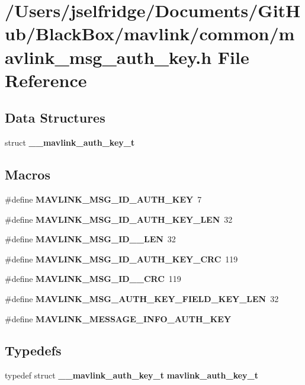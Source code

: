 \section{/\+Users/jselfridge/\+Documents/\+Git\+Hub/\+Black\+Box/mavlink/common/mavlink\+\_\+msg\+\_\+auth\+\_\+key.h File Reference}
\label{mavlink__msg__auth__key_8h}
\subsection*{Data Structures}
\begin{DoxyCompactItemize}
\item 
struct \textbf{ \+\_\+\+\_\+mavlink\+\_\+auth\+\_\+key\+\_\+t}
\end{DoxyCompactItemize}
\subsection*{Macros}
\begin{DoxyCompactItemize}
\item 
\#define \textbf{ M\+A\+V\+L\+I\+N\+K\+\_\+\+M\+S\+G\+\_\+\+I\+D\+\_\+\+A\+U\+T\+H\+\_\+\+K\+EY}~7
\item 
\#define \textbf{ M\+A\+V\+L\+I\+N\+K\+\_\+\+M\+S\+G\+\_\+\+I\+D\+\_\+\+A\+U\+T\+H\+\_\+\+K\+E\+Y\+\_\+\+L\+EN}~32
\item 
\#define \textbf{ M\+A\+V\+L\+I\+N\+K\+\_\+\+M\+S\+G\+\_\+\+I\+D\+\_\+\_\+\+L\+EN}~32
\item 
\#define \textbf{ M\+A\+V\+L\+I\+N\+K\+\_\+\+M\+S\+G\+\_\+\+I\+D\+\_\+\+A\+U\+T\+H\+\_\+\+K\+E\+Y\+\_\+\+C\+RC}~119
\item 
\#define \textbf{ M\+A\+V\+L\+I\+N\+K\+\_\+\+M\+S\+G\+\_\+\+I\+D\+\_\+\_\+\+C\+RC}~119
\item 
\#define \textbf{ M\+A\+V\+L\+I\+N\+K\+\_\+\+M\+S\+G\+\_\+\+A\+U\+T\+H\+\_\+\+K\+E\+Y\+\_\+\+F\+I\+E\+L\+D\+\_\+\+K\+E\+Y\+\_\+\+L\+EN}~32
\item 
\#define \textbf{ M\+A\+V\+L\+I\+N\+K\+\_\+\+M\+E\+S\+S\+A\+G\+E\+\_\+\+I\+N\+F\+O\+\_\+\+A\+U\+T\+H\+\_\+\+K\+EY}
\end{DoxyCompactItemize}
\subsection*{Typedefs}
\begin{DoxyCompactItemize}
\item 
typedef struct \textbf{ \+\_\+\+\_\+mavlink\+\_\+auth\+\_\+key\+\_\+t} \textbf{ mavlink\+\_\+auth\+\_\+key\+\_\+t}
\end{DoxyCompactItemize}


